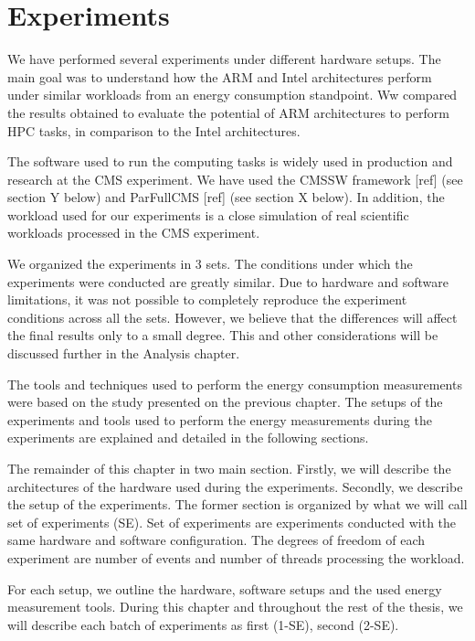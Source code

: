 \chapter{Experiments}


We have performed several experiments under different hardware setups. 
The main goal was to understand how the ARM and Intel architectures
perform under similar workloads from an energy
consumption standpoint. Ww compared the results
obtained to evaluate the potential of ARM architectures to perform HPC tasks, in
comparison to the Intel architectures.

The software used to run the computing tasks is
widely used in production and research at the CMS experiment. We have used the
CMSSW framework [ref] (see section Y below) and ParFullCMS [ref] (see section X
below). In addition, the workload used for our experiments is a close
simulation of real scientific workloads processed in the CMS experiment.

We organized the experiments in 3 sets. The conditions under which the
experiments were conducted are greatly similar. Due to hardware and software
limitations, it was not possible to completely reproduce the experiment
conditions across all the sets. However, we believe that the differences will
affect the final results only to a small degree. This and other considerations
will be discussed further in the Analysis chapter. 

The tools and techniques used to perform the energy
consumption measurements were based on the study presented on the previous
chapter. The setups of the experiments and tools used to perform the energy
measurements during the experiments are explained and detailed in the following
sections.

The remainder of this chapter in two main section. Firstly, we will describe the
architectures of the hardware used during the experiments.  Secondly, we describe
the setup of the experiments. The former section is organized by what we will
call set of experiments (SE). Set of experiments are experiments conducted with
the same hardware and software configuration. The degrees of freedom of each
experiment are number of events and number of threads processing the workload.
 
For each setup, we outline the hardware, software setups and the used energy measurement tools. 
During this chapter and throughout the rest of the thesis, we will describe
each batch of experiments as first (1-SE), 
second (2-SE).


